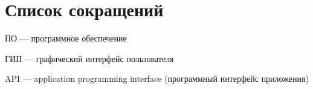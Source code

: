 \section*{Список сокращений}

ПО — программное обеспечение

ГИП — графический интерфейс пользователя

API — application programming interface (программный интерфейс приложения)
